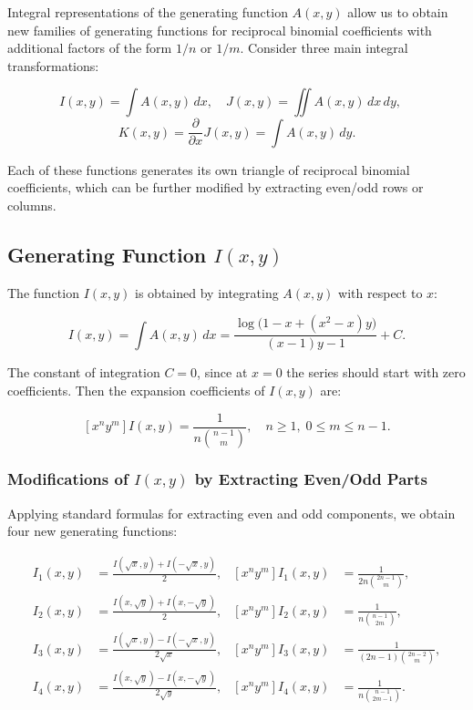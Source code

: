 \documentclass[12pt]{article}
\begin{document}
Integral representations of the generating function \(A(x,y)\) allow us to obtain new families of generating functions for reciprocal binomial coefficients with additional factors of the form \(1/n\) or \(1/m\). Consider three main integral transformations:

\[
I(x,y)=\int A(x,y)\,dx, \quad
J(x,y)=\iint A(x,y)\,dx\,dy, \quad
\]
\[
K(x,y)=\frac{\partial}{\partial x} J(x,y) = \int A(x,y)\,dy.
\]

Each of these functions generates its own triangle of reciprocal binomial coefficients, which can be further modified by extracting even/odd rows or columns.

\subsection{Generating Function \(I(x,y)\)}

The function \(I(x,y)\) is obtained by integrating \(A(x,y)\) with respect to \(x\):

\[
I(x,y) = \int A(x,y)\,dx
       = \frac{\log\bigl(1 - x + (x^2 - x)y\bigr)}{(x-1)y - 1} + C.
\]

The constant of integration \(C = 0\), since at \(x=0\) the series should start with zero coefficients. Then the expansion coefficients of \(I(x,y)\) are:

\[
[x^n y^m] I(x,y) = \frac{1}{n \binom{n-1}{m}}, \quad n \geq 1,\; 0 \leq m \leq n-1.
\]

\subsubsection{Modifications of \(I(x,y)\) by Extracting Even/Odd Parts}

Applying standard formulas for extracting even and odd components, we obtain four new generating functions:

\begin{align*}
I_1(x,y) &= \frac{I(\sqrt{x}, y) + I(-\sqrt{x}, y)}{2}, &
[x^n y^m] I_1(x,y) &= \frac{1}{2n \binom{2n-1}{m}},\\
I_2(x,y) &= \frac{I(x, \sqrt{y}) + I(x, -\sqrt{y})}{2}, &
[x^n y^m] I_2(x,y) &= \frac{1}{n \binom{n-1}{2m}},\\
I_3(x,y) &= \frac{I(\sqrt{x}, y) - I(-\sqrt{x}, y)}{2\sqrt{x}}, &
[x^n y^m] I_3(x,y) &= \frac{1}{(2n-1) \binom{2n-2}{m}},\\
I_4(x,y) &= \frac{I(x, \sqrt{y}) - I(x, -\sqrt{y})}{2\sqrt{y}}, &
[x^n y^m] I_4(x,y) &= \frac{1}{n \binom{n-1}{2m-1}}.
\end{align*}
\end{document}
